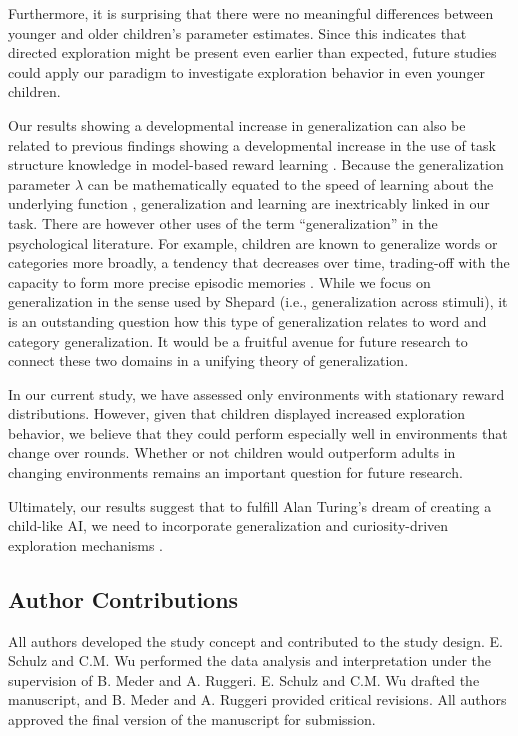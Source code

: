 \documentclass[a4paper,man, floatsintext, natbib]{apa6}
\begin{document}
Furthermore, it is surprising that there were no meaningful differences between younger and older children's parameter estimates. Since this indicates that directed exploration might be present even earlier than expected, future studies could apply our paradigm to investigate exploration behavior in even younger children.

Our results showing a developmental increase in generalization can also be related to previous findings showing a developmental increase in the use of task structure knowledge in model-based reward learning \citep{decker2016creatures}. Because the generalization parameter $\lambda$ can be mathematically equated to the speed of learning about the underlying function \citep{sollich1999learning}, generalization and learning are inextricably linked in our task. There are however other uses of the term ``generalization'' in the psychological literature. For example, children are known to generalize words or categories more broadly, a tendency that decreases over time, trading-off with the capacity to form more precise episodic memories \citep{keresztes2018hippocampal}. While we focus on generalization in the sense used by Shepard (i.e., generalization across stimuli), it is an outstanding question how this type of generalization relates to word and category generalization. It would be a fruitful avenue for future research to connect these two domains in a unifying theory of generalization. 

In our current study, we have assessed only environments with stationary reward distributions. However, given that children displayed increased exploration behavior, we believe that they could perform especially well in environments that change over rounds. Whether or not children would outperform adults in changing environments remains an important question for future research.

Ultimately, our results suggest that to fulfill Alan Turing's dream of creating a child-like AI, we need to incorporate generalization and curiosity-driven exploration mechanisms \citep{riedmiller2018learning}.



\subsection{Author Contributions}
\noindent
All authors developed the study concept and contributed to the study design. E. Schulz and C.M. Wu performed the data analysis and interpretation under the supervision of B. Meder and A. Ruggeri. E. Schulz and C.M. Wu drafted the manuscript, and B. Meder and A. Ruggeri provided critical revisions. All authors approved the final version of the manuscript for submission.
\end{document}

